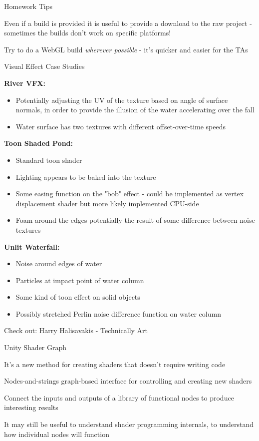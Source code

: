 \documentclass[11pt]{article}
\begin{document}
\maketitle

\begin{topic}{Homework Tips}
	\item Even if a build is provided it is useful to provide a download to the raw project - sometimes the builds don't work on specific platforms!
	\item Try to do a WebGL build \textit{wherever possible} - it's quicker and easier for the TAs
\end{topic}

\begin{topic}{Visual Effect Case Studies}
	\item \textbf{River VFX:}
	\begin{itemize}
		\item Potentially adjusting the UV of the texture based on angle of surface normals, in order to provide the illusion of the water accelerating over the fall
		\item Water surface has two textures with different offset-over-time speeds
	\end{itemize}
	\item \textbf{Toon Shaded Pond:}
	\begin{itemize}
		\item Standard toon shader
		\item Lighting appears to be baked into the texture
		\item Some easing function on the "bob" effect - could be implemented as vertex displacement shader but more likely implemented CPU-side
		\item Foam around the edges potentially the result of some difference between noise textures
	\end{itemize}
	\item \textbf{Unlit Waterfall:} 
	\begin{itemize}
		\item Noise around edges of water
		\item Particles at impact point of water column
		\item Some kind of toon effect on solid objects
		\item Possibly stretched Perlin noise difference function on water column
	\end{itemize}
	\item Check out: Harry Halisavakis - Technically Art
\end{topic}

\begin{topic}{Unity Shader Graph}
	\item It's a new method for creating shaders that doesn't require writing code
	\item Nodes-and-strings graph-based interface for controlling and creating new shaders
	\item Connect the inputs and outputs of a library of functional nodes to produce interesting results
	\item It may still be useful to understand shader programming internals, to understand how individual nodes will function
\end{topic}
\end{document}
